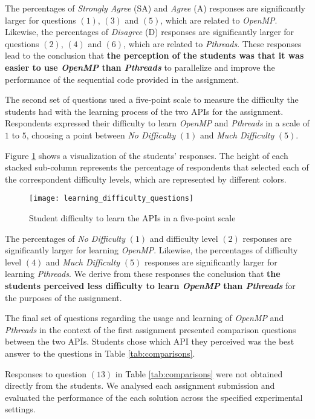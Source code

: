 The percentages of \textit{Strongly Agree} (SA) and \textit{Agree} (A)
responses are significantly larger for questions $(1)$, $(3)$ and $(5)$, which
are related to \textit{OpenMP}.  Likewise, the percentages of \textit{Disagree}
(D) responses are significantly larger for questions $(2)$, $(4)$ and $(6)$,
which are related to \textit{Pthreads}. These responses lead to the conclusion
that \textbf{the perception of the students was that it was easier to use
\textit{OpenMP} than \textit{Pthreads}} to parallelize and improve the
performance of the sequential code provided in the assignment.

The second set of questions used a five-point scale to measure the difficulty
the students had with the learning process of the two APIs for the assignment.
Respondents expressed their difficulty to learn \textit{OpenMP} and
\textit{Pthreads} in a scale of $1$ to $5$, choosing a point between \textit{No
Difficulty} $(1)$ and \textit{Much Difficulty} $(5)$.

Figure \ref{fig:learning} shows a visualization of the students' responses.
The height of each stacked sub-column represents the percentage of respondents
that selected each of the correspondent difficulty levels, which are
represented by different colors.

\begin{figure}[htpb]
    \centering
    \texttt{[image: learning\_difficulty\_questions]}
    \caption{Student difficulty to learn the APIs in a five-point scale}
    \label{fig:learning}
\end{figure}

The percentages of \textit{No Difficulty} $(1)$ and difficulty level $(2)$
responses are significantly larger for learning \textit{OpenMP}. Likewise, the
percentages of difficulty level $(4)$ and \textit{Much Difficulty} $(5)$
responses are significantly larger for learning \textit{Pthreads}.  We derive
from these responses the conclusion that \textbf{the students perceived less
difficulty to learn \textit{OpenMP} than \textit{Pthreads}} for the purposes of
the assignment.

The final set of questions regarding the usage and learning of \textit{OpenMP}
and \textit{Pthreads} in the context of the first assignment presented
comparison questions between the two APIs. Students chose which API they
perceived was the best answer to the questions in Table \ref{tab:comparisons}.

Responses to question $(13)$ in Table \ref{tab:comparisons} were not obtained
directly from the students. We analysed each assignment submission and
evaluated the performance of the each solution across the specified
experimental settings.

